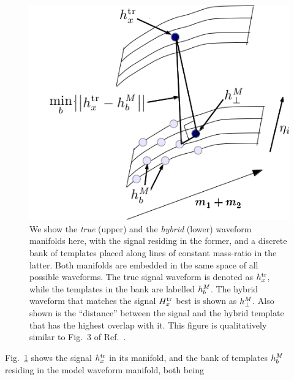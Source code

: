\begin{figure}
 \centering
\includegraphics[width=\columnwidth]{figures/nrhybbank/Eff1v2.png}%
\caption{We show the \textit{true} (upper) and the \textit{hybrid} (lower) 
waveform manifolds here, with the signal residing in the former, and a discrete
bank of templates placed along lines of constant mass-ratio in the latter. 
Both manifolds are embedded in the same space of all possible waveforms.
The true signal waveform is denoted as $h^{\mathrm{tr}}_x$, while the templates in the
bank are labelled $h^{\mathit{M}}_b$. The hybrid waveform that matches the signal $H^{\mathrm{tr}}_x$
best is shown as $h^{\mathit{M}}_\perp$. Also shown is the ``distance'' between
the signal and the hybrid template that has the highest overlap with it.
This figure is qualitatively similar to Fig.~3 of
Ref.~\cite{WaveformAccuracy2008}.}
\label{fig:EFFdiag1}
\end{figure}
Fig.~\ref{fig:EFFdiag1} shows the signal $h^{\mathrm{tr}}_x$ in its manifold, and the
bank of templates $h^{\mathit{M}}_b$ residing in the model waveform manifold, both being
